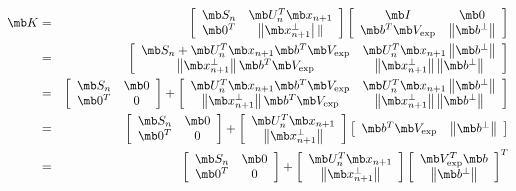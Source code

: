 \begin{eqnarray}
    \mb K &=& \left[ \begin{array}{cc} \mb S_n & \mb U_n^T \mb x_{n+1} \\
    \mb 0^T & \left\| \mb x^\perp_{n+1} \right|\|  \end{array} \right] \left[ \begin{array}{cc} \mb I & \mb 0  \\
    \mb b^T \mb V_{\text{exp}} & \left\| \mb b^\perp \right \|  \end{array} \right] \\
    &=& \left[ \begin{array}{cc} \mb S_n + \mb U_n^T \mb x_{n+1} \mb b^T \mb V_{\text{exp}} & \mb U_n^T \mb x_{n+1} \left\| \mb b^\perp \right \| \\
    \left\| \mb x^\perp_{n+1} \right\| \mb b^T \mb V_{\text{exp}} & \left\| \mb x^\perp_{n+1} \right\| \left\| \mb b^\perp \right \|  \end{array} \right] \\
    &=& \left[ \begin{array}{cc} \mb S_n & \mb 0 \\
    \mb 0^T & 0  \end{array} \right] + \left[ \begin{array}{cc} \mb U_n^T \mb x_{n+1} \mb b^T \mb V_{\text{exp}} & \mb U_n^T \mb x_{n+1} \left\| \mb b^\perp \right \| \\
    \left\| \mb x^\perp_{n+1} \right\| \mb b^T \mb V_{\text{exp}} & \left\| \mb x^\perp_{n+1} \right\| \left\| \mb b^\perp \right \|  \end{array} \right] \\
    &=& \left[ \begin{array}{cc} \mb S_n & \mb 0 \\
    \mb 0^T & 0  \end{array} \right] + \left[ \begin{array}{c} \mb U_n^T \mb x_{n+1} \\ \left\| \mb x^\perp_{n+1} \right\|  \end{array} \right] \left[ \begin{array}{cc} \mb b^T  \mb V_{\text{exp}} & \left\| \mb b^\perp \right\|  \end{array} \right] \\
    &=& \left[ \begin{array}{cc} \mb S_n & \mb 0 \\
    \mb 0^T & 0  \end{array} \right] + \left[ \begin{array}{c} \mb U_n^T \mb x_{n+1} \\ \left\| \mb x^\perp_{n+1} \right\|  \end{array} \right] \left[ \begin{array}{c}  \mb V_{\text{exp}}^T \mb b  \\ \left\| \mb b^\perp \right\|  \end{array} \right]^T \label{eqn:sparse_K}
\end{eqnarray}

